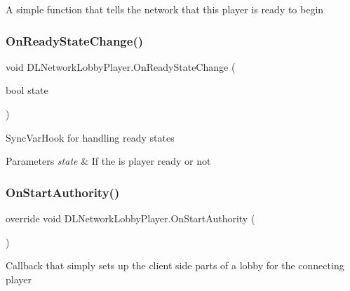 A simple function that tells the network that this player is ready to begin 

\hypertarget{class_d_l_network_lobby_player_af960bcf62b831a8d546bc3623152f882}{}\label{class_d_l_network_lobby_player_af960bcf62b831a8d546bc3623152f882} 
\subsubsection{\texorpdfstring{On\+Ready\+State\+Change()}{OnReadyStateChange()}}
{\footnotesize\ttfamily void D\+L\+Network\+Lobby\+Player.\+On\+Ready\+State\+Change (\begin{DoxyParamCaption}\item[{bool}]{state }\end{DoxyParamCaption})}



Sync\+Var\+Hook for handling ready states 


\begin{DoxyParams}{Parameters}
{\em state} & If the is player ready or not\\
\hline
\end{DoxyParams}
\hypertarget{class_d_l_network_lobby_player_a1e0fa979ad95efaf24055632940fd2fb}{}\label{class_d_l_network_lobby_player_a1e0fa979ad95efaf24055632940fd2fb} 
\subsubsection{\texorpdfstring{On\+Start\+Authority()}{OnStartAuthority()}}
{\footnotesize\ttfamily override void D\+L\+Network\+Lobby\+Player.\+On\+Start\+Authority (\begin{DoxyParamCaption}{ }\end{DoxyParamCaption})}



Callback that simply sets up the client side parts of a lobby for the connecting player 

\hypertarget{class_d_l_network_lobby_player_a1b4e00a130627290eb4e7b281037b07b}{}\label{class_d_l_network_lobby_player_a1b4e00a130627290eb4e7b281037b07b} 
